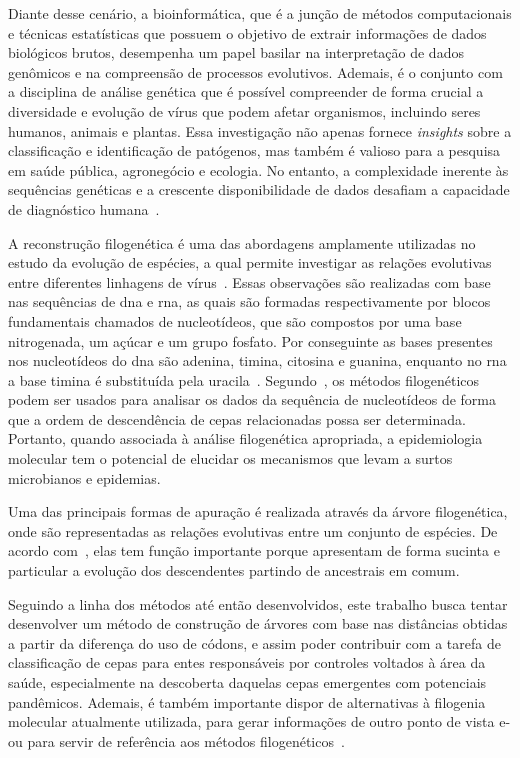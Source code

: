 Diante desse cenário, a bioinformática, que é a junção de métodos computacionais e técnicas estatísticas que possuem o objetivo de extrair informações de dados biológicos brutos, desempenha um papel basilar na interpretação de dados genômicos e na compreensão de processos evolutivos\cite{herramientas_gonzales_2016}. Ademais, é o conjunto com a disciplina de análise genética que é possível compreender de forma crucial a diversidade e evolução de vírus que podem afetar organismos, incluindo seres humanos, animais e plantas. Essa investigação não apenas fornece \textit{insights} sobre a classificação e identificação de patógenos, mas também é valioso para a pesquisa em saúde pública, agronegócio e ecologia. No entanto, a complexidade inerente às sequências genéticas e a crescente disponibilidade de dados desafiam a capacidade de diagnóstico humana~\cite{virology_edward_2007, diversidade_flores_2000}.

A reconstrução filogenética é uma das abordagens amplamente utilizadas no estudo da evolução de espécies, a qual permite investigar as relações evolutivas entre diferentes linhagens de vírus~\cite{sistematica_santos_2012, consideracoes_ribas_2006,dinossauros_santos_2008}. Essas observações são realizadas com base nas sequências de \gls{dna} e \gls{rna}, as quais são formadas respectivamente por blocos fundamentais chamados de nucleotídeos, que são compostos por uma base nitrogenada, um açúcar e um grupo fosfato. Por conseguinte as bases presentes nos nucleotídeos do \gls{dna} são \gls{adenina}, \gls{timina}, \gls{citosina} e \gls{guanina}, enquanto no \gls{rna} a base \gls{timina} é substituída pela \gls{uracila}~\cite{alberts_molecular_2002,molecular_bernard_2022,genetica_peter_2017}.
Segundo~, os métodos filogenéticos podem ser usados para analisar os dados da sequência de nucleotídeos de forma que a ordem de descendência de cepas relacionadas possa ser determinada. Portanto, quando associada à análise filogenética apropriada, a epidemiologia molecular tem o potencial de elucidar os mecanismos que levam a surtos microbianos e epidemias.

Uma das principais formas de apuração é realizada através da árvore filogenética, onde são representadas as relações evolutivas entre um conjunto de espécies. De acordo com~, elas tem função importante porque apresentam de forma sucinta e particular a evolução dos descendentes partindo de ancestrais em comum.

Seguindo a linha dos métodos até então desenvolvidos, este trabalho busca tentar desenvolver um método de construção de árvores com base nas distâncias obtidas a partir da diferença do uso de códons, e assim poder contribuir com a tarefa de classificação de cepas para entes responsáveis por controles voltados à área da saúde, especialmente na descoberta daquelas cepas emergentes com potenciais pandêmicos. Ademais, é também importante dispor de alternativas à filogenia molecular atualmente utilizada, para gerar informações de outro ponto de vista e-ou para servir de referência aos métodos filogenéticos~\cite{virology_flint_2015}.

